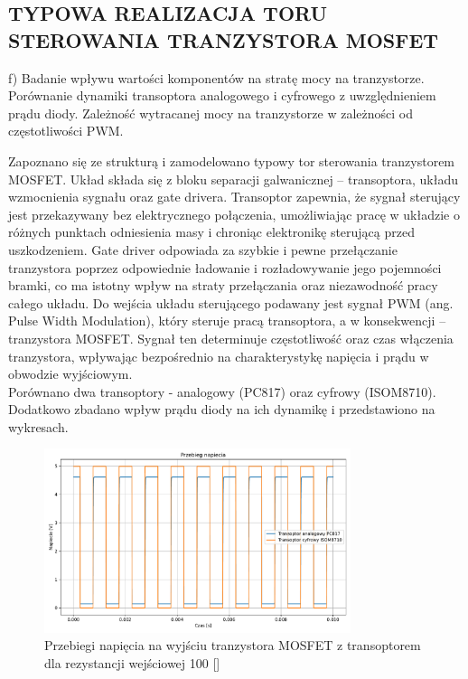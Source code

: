 \documentclass[11pt]{article}
\begin{document}
\subsection{TYPOWA REALIZACJA TORU STEROWANIA TRANZYSTORA MOSFET}

f) Badanie wpływu wartości komponentów na stratę mocy na tranzystorze. Porównanie dynamiki transoptora analogowego i cyfrowego z uwzględnieniem prądu diody. Zależność wytracanej mocy na tranzystorze w zależności od częstotliwości PWM.

Zapoznano się ze strukturą i zamodelowano typowy tor sterowania tranzystorem MOSFET.
Układ składa się z bloku separacji galwanicznej – transoptora, układu wzmocnienia sygnału oraz gate drivera.
Transoptor zapewnia, że sygnał sterujący jest przekazywany bez elektrycznego połączenia, umożliwiając pracę w układzie o różnych punktach odniesienia masy i chroniąc elektronikę sterującą przed uszkodzeniem.
Gate driver odpowiada za szybkie i pewne przełączanie tranzystora poprzez odpowiednie ładowanie i rozładowywanie jego pojemności bramki, co ma istotny wpływ na straty przełączania oraz niezawodność pracy całego układu.
Do wejścia układu sterującego podawany jest sygnał PWM (ang. Pulse Width Modulation), który steruje pracą transoptora, a w konsekwencji – tranzystora MOSFET. Sygnał ten determinuje częstotliwość oraz czas włączenia tranzystora, wpływając bezpośrednio na charakterystykę napięcia i prądu w obwodzie wyjściowym.\\

Porównano dwa transoptory - analogowy (PC817) oraz cyfrowy (ISOM8710). 
Dodatkowo zbadano wpływ prądu diody na ich dynamikę i przedstawiono na wykresach.\\

\begin{figure}[H]
\centering
\includegraphics[width=0.8\textwidth]{aun1_gate_circuit_digital_vs_analog_rin100ohm.pdf}
\caption{Przebiegi napięcia na wyjściu tranzystora MOSFET z transoptorem dla rezystancji wejściowej 100 [\Omega]}
\end{figure}
\end{document}
